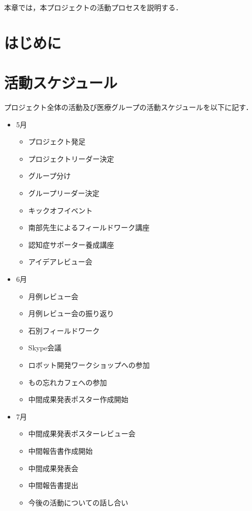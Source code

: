 \documentclass[../report]{subfiles}
\begin{document}
本章では，本プロジェクトの活動プロセスを説明する．

\section{はじめに}


\section{活動スケジュール}
プロジェクト全体の活動及び医療グループの活動スケジュールを以下に記す．

\begin{itemize}
  \item[] 5月
    \begin{itemize}
      \item プロジェクト発足
      \item プロジェクトリーダー決定
      \item グループ分け
      \item グループリーダー決定
      \item キックオフイベント
      \item 南部先生によるフィールドワーク講座
      \item 認知症サポーター養成講座
      \item アイデアレビュー会
    \end{itemize}
  \item[] 6月
    \begin{itemize}
      \item 月例レビュー会
      \item 月例レビュー会の振り返り
      \item 石別フィールドワーク
      \item Skype会議
      \item ロボット開発ワークショップへの参加
      \item もの忘れカフェへの参加
      \item 中間成果発表ポスター作成開始
    \end{itemize}
  \item[] 7月
    \begin{itemize}
      \item 中間成果発表ポスターレビュー会
      \item 中間報告書作成開始
      \item 中間成果発表会
      \item 中間報告書提出
      \item 今後の活動についての話し合い

\end{itemize}
\end{itemize}
\end{document}
